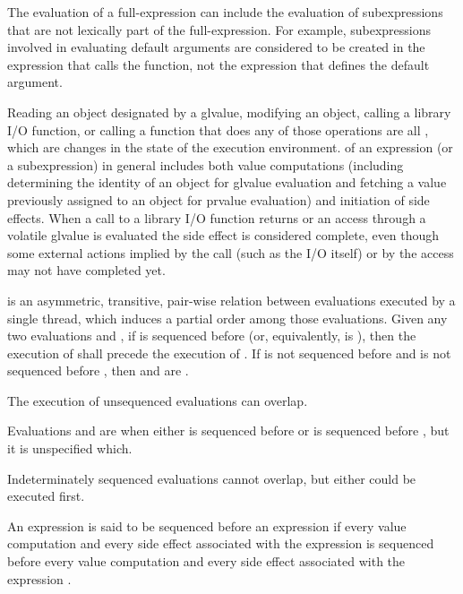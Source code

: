 \pnum
\begin{note}
The evaluation of a full-expression can include the
evaluation of subexpressions that are not lexically part of the
full-expression. For example, subexpressions involved in evaluating
default arguments are considered to
be created in the expression that calls the function, not the expression
that defines the default argument.
\end{note}

\pnum
{}%
Reading an object designated by a 
glvalue, modifying an object, calling a library I/O
function, or calling a function that does any of those operations are
all
, which are changes in the state of the execution
environment.  of an expression (or a
subexpression) in general includes both value computations (including
determining the identity of an object for glvalue evaluation and fetching
a value previously assigned to an object for prvalue evaluation) and
initiation of side effects. When a call to a library I/O function
returns or an access through a volatile glvalue is evaluated the side
effect is considered complete, even though some external actions implied
by the call (such as the I/O itself) or by the  access
may not have completed yet.

\pnum
{} is an asymmetric, transitive, pair-wise relation between
evaluations executed by a single thread, which induces
a partial order among those evaluations. Given any two evaluations  and
, if  is sequenced before 
(or, equivalently,  is  ),
then the execution of
 shall precede the execution of . If  is not sequenced
before  and  is not sequenced before , then  and
 are .
\begin{note}
The execution of unsequenced
evaluations can overlap.
\end{note}
Evaluations  and  are
 when either  is sequenced before
 or  is sequenced before , but it is unspecified which.
\begin{note}
Indeterminately sequenced evaluations cannot overlap, but either
could be executed first.
\end{note}
An expression 
is said to be sequenced before
an expression  if
every value computation and every side effect
associated with the expression 
is sequenced before
every value computation and every side effect
associated with the expression .

